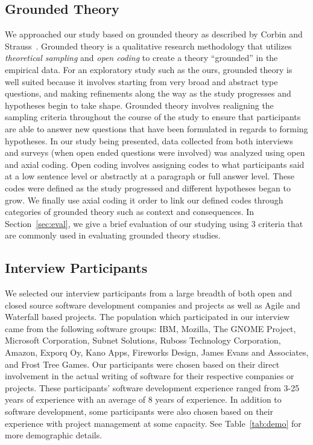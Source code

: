\documentclass[conference]{IEEEtran}
\begin{document}
\subsection{Grounded Theory}
We approached our study based on grounded theory as described by Corbin and Strauss~\cite{Corbin:1998:SP}.
Grounded theory is a qualitative research methodology that utilizes \textit{theoretical sampling} and
\textit{open coding} to create a theory ``grounded'' in the empirical data. For an exploratory study such as
the ours, grounded theory is well suited because it involves starting from very broad and abstract type questions, and
making refinements along the way as the study progresses and hypotheses begin to take shape. Grounded theory involves
realigning the sampling criteria throughout the course of the study to ensure that participants are able to answer new
questions that have been formulated in regards to forming hypotheses. In our study being presented, data collected from
both interviews and surveys (when open ended questions were involved) was analyzed using open and axial coding. Open coding involves
assigning codes to what participants said at a low sentence level or abstractly at a paragraph or full answer level. These
codes were defined as the study progressed and different hypotheses began to grow. We finally use axial coding it order to
link our defined codes through categories of grounded theory such as context and consequences. 
In Section~\ref{sec:eval}, we give a brief evaluation of our studying using 
3 criteria that are commonly used in evaluating grounded theory studies.

\subsection{Interview Participants}

We selected our interview participants from a large breadth of both open and closed source software development companies
and projects as well as Agile and Waterfall based projects.
The population which participated in our interview came from the following software groups: 
IBM, Mozilla, The GNOME Project, Microsoft Corporation, Subnet Solutions, Ruboss Technology Corporation, 
Amazon, Exporq Oy, Kano Apps, Fireworks Design, James Evans and Associates, and Frost Tree Games. 
Our participants were chosen based on their direct involvement in the actual writing of software for
their respective companies or projects. These participants' software development experience ranged from 3-25 years of experience
with an average of 8 years of experience.
In addition to software development, some participants were also chosen based on their experience with project management
at some capacity. See Table~\ref{tab:demo} for more demographic details.
\end{document}
